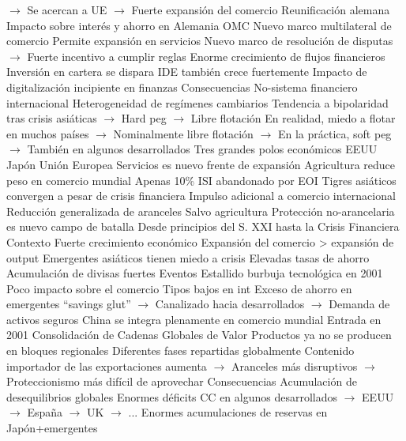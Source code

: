 \documentclass{nuevotema}
\begin{document}
\begin{esquemal}
				\4[] $\to$ Se acercan a UE
				\4[] $\to$ Fuerte expansión del comercio
				\4 Reunificación alemana
				\4[] Impacto sobre interés y ahorro en Alemania
				\4 OMC
				\4[] Nuevo marco multilateral de comercio
				\4[] Permite expansión en servicios
				\4[] Nuevo marco de resolución de disputas
				\4[] $\to$ Fuerte incentivo a cumplir reglas
				\4 Enorme crecimiento de flujos financieros
				\4[] Inversión en cartera se dispara
				\4[] IDE también crece fuertemente
				\4[] Impacto de digitalización incipiente en finanzas
			\3 Consecuencias
				\4 No-sistema financiero internacional
				\4[] Heterogeneidad de regímenes cambiarios
				\4[] Tendencia a bipolaridad tras crisis asiáticas
				\4[] $\to$ Hard peg
				\4[] $\to$ Libre flotación
				\4[] En realidad, miedo a flotar en muchos países
				\4[] $\to$ Nominalmente libre flotación
				\4[] $\to$ En la práctica, soft peg
				\4[] $\to$ También en algunos desarrollados
				\4 Tres grandes polos económicos
				\4[] EEUU
				\4[] Japón
				\4[] Unión Europea
				\4 Servicios es nuevo frente de expansión
				\4 Agricultura reduce peso en comercio mundial
				\4[] Apenas 10\%
				\4 ISI abandonado por EOI
				\4[] Tigres asiáticos convergen a pesar de crisis financiera
				\4[] Impulso adicional a comercio internacional
				\4 Reducción generalizada de aranceles
				\4[] Salvo agricultura
				\4[] Protección no-arancelaria es nuevo campo de batalla
		\2 Desde principios del S. XXI hasta la Crisis Financiera
			\3 Contexto
				\4 Fuerte crecimiento económico
				\4 Expansión del comercio > expansión de output
				\4 Emergentes asiáticos tienen miedo a crisis
				\4[] Elevadas tasas de ahorro
				\4[] Acumulación de divisas fuertes
			\3 Eventos
				\4 Estallido burbuja tecnológica en 2001
				\4[] Poco impacto sobre el comercio
				\4 Tipos bajos en int
				\4 Exceso de ahorro en emergentes
				\4[] ``savings glut''
				\4[] $\to$ Canalizado hacia desarrollados
				\4[] $\to$ Demanda de activos seguros
				\4 China se integra plenamente en comercio mundial
				\4[] Entrada en 2001
				\4 Consolidación de Cadenas Globales de Valor
				\4[] Productos ya no se producen en bloques regionales
				\4[] Diferentes fases repartidas globalmente
				\4[] Contenido importador de las exportaciones aumenta
				\4[] $\to$ Aranceles más disruptivos
				\4[] $\to$ Proteccionismo más difícil de aprovechar
			\3 Consecuencias
				\4 Acumulación de desequilibrios globales
				\4[] Enormes déficits CC en algunos desarrollados
				\4[] $\to$ EEUU
				\4[] $\to$ España
				\4[] $\to$ UK
				\4[] $\to$ ...
				\4[] Enormes acumulaciones de reservas en Japón+emergentes

\end{esquemal}
\end{document}
